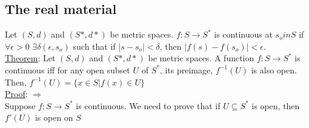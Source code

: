 \documentclass[11pt]{article}
\begin{document}
	\subsection*{The real material}
		Let $(S,d)$ and $(S*, d*)$ be metric spaces. $f: S \to S^*$ is continuous
		at $s_o in S$ if $\forall \epsilon > 0$ $\exists \delta(\epsilon, s_o)$
		such that if $|s - s_o| < \delta$, then $|f(s) - f(s_o)| < \epsilon$.\\
		\underline{Theorem}: Let $(S,d)$ and $(S*,d*)$ be metric spaces. A function
		$f: S \to S^*$ is continuous iff for any open subset $U$ of $S^*$, its
		preimage, $f^{-1}(U)$ is also open.\\
		Then, $f^{-1}(U) = \{ x \in S | f(x) \in U \}$\\
		\underline{Proof}: $\Rightarrow$\\
			Suppose $f: S \to S^*$ is continuous. We need to prove that if $U 
			\subseteq	S^*$ is open, then $f'(U)$ is open on $S$\\
\end{document}
